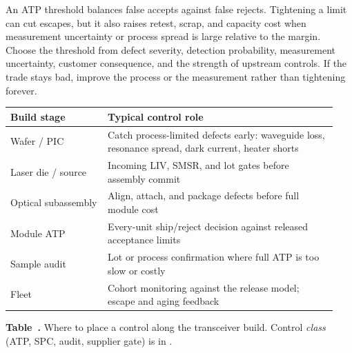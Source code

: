 An ATP threshold balances false accepts against false rejects. Tightening a
limit can cut escapes, but it also raises retest, scrap, and capacity cost when
measurement uncertainty or process spread is large relative to the margin. Choose
the threshold from defect severity, detection probability, measurement
uncertainty, customer consequence, and the strength of upstream controls. If the
trade stays bad, improve the process or the measurement rather than tightening
forever.

\begin{table}[ht]
\label{tab:mfg-control-placement}%
\centering
\setlength{\tabcolsep}{3pt}%
\footnotesize
\renewcommand{\arraystretch}{1.2}%
\begin{tabular}{@{}p{0.28\linewidth}p{0.66\linewidth}@{}}
\toprule
Build stage & Typical control role \\
\midrule
Wafer / PIC & Catch process-limited defects early: waveguide loss, resonance
spread, dark current, heater shorts \\
\addlinespace[0.6em]
Laser die / source & Incoming LIV, SMSR, and lot gates before assembly commit \\
\addlinespace[0.6em]
Optical subassembly & Align, attach, and package defects before full module cost \\
\addlinespace[0.6em]
Module ATP & Every-unit ship/reject decision against released acceptance limits \\
\addlinespace[0.6em]
Sample audit & Lot or process confirmation where full ATP is too slow or costly \\
\addlinespace[0.6em]
Fleet & Cohort monitoring against the release model; escape and aging feedback \\
\bottomrule
\end{tabular}
\par\medskip
{\raggedright\footnotesize\textbf{Table~\thetable.} Where to place a control
along the transceiver build. Control \emph{class} (ATP, SPC, audit, supplier
gate) is in .\par}
\end{table}
\FloatBarrier


